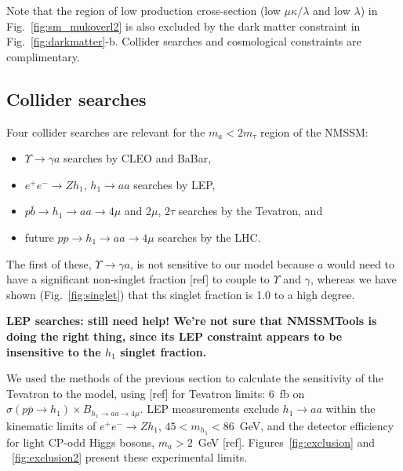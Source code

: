 \documentclass[aps,12pt,superscriptaddress,nofootinbib,floatfix,showpacs]{revtex4}
\begin{document}
Note that the region of low production cross-section (low
$\mu\kappa/\lambda$ and low $\lambda$) in Fig.~\ref{fig:sm_mukoverl2}
is also excluded by the dark matter constraint in
Fig.~\ref{fig:darkmatter}-b.  Collider searches and cosmological
constraints are complimentary.

\subsection{Collider searches}

Four collider searches are relevant for the $m_a < 2m_\tau$ region of
the NMSSM:
\begin{itemize}
\item $\Upsilon \to \gamma a$ searches by CLEO and BaBar,
\item $e^+e^- \to Zh_1$, $h_1 \to aa$ searches by LEP,
\item $p\bar{b} \to h_1 \to aa \to 4\mu$ and $2\mu$, $2\tau$ searches
  by the Tevatron, and
\item future $pp \to h_1 \to aa \to 4\mu$ searches by the LHC.
\end{itemize}

The first of these, $\Upsilon \to \gamma a$, is not sensitive to our
model because $a$ would need to have a significant non-singlet
fraction [ref] to couple to $\Upsilon$ and $\gamma$, whereas we have
shown (Fig.~\ref{fig:singlet}) that ths singlet fraction is 1.0 to a
high degree.

{\bf LEP searches: still need help!  We're not sure that NMSSMTools is
  doing the right thing, since its LEP constraint appears to be
  insensitive to the $h_1$ singlet fraction.}

We used the methods of the previous section to calculate the
sensitivity of the Tevatron to the model, using [ref] for Tevatron
limits: 6~fb on $\sigma(p\bar{p} \to h_1) \times B_{h_1 \to aa \to
  4\mu}$.  LEP measurements exclude $h_1 \to aa$ within the kinematic
limits of $e^+e^- \to Z h_1$, $45 < m_{h_1} < 86$~GeV, and the
detector efficiency for light CP-odd Higgs bosons, $m_a > 2$~GeV
[ref].  Figures~\ref{fig:exclusion} and ~\ref{fig:exclusion2} present
these experimental limits.
\end{document}
